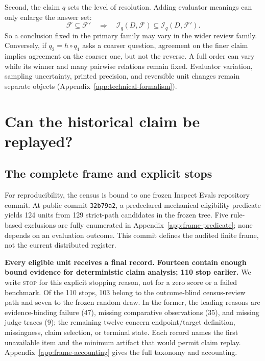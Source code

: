 \documentclass{article}
\newcommand{\STOP}{\textsc{stop}}
\newcommand{\F}{\mathcal F}
\newcommand{\I}{\mathcal I}
\begin{document}
Second, the claim \(q\) sets the level of resolution.  Adding evaluator meanings can only enlarge the answer set:
\begin{equation}
  \F\subseteq\F'
  \quad\Longrightarrow\quad
  \I_q(D,\F)\subseteq\I_q(D,\F').
  \label{eq:domain-monotonicity}
\end{equation}
So a conclusion fixed in the primary family may vary in the wider review family.  Conversely, if \(q_2=h\circ q_1\) asks a coarser question, agreement on the finer claim implies agreement on the coarser one, but not the reverse.  A full order can vary while its winner and many pairwise relations remain fixed.  Evaluator variation, sampling uncertainty, printed precision, and reversible unit changes remain separate objects (Appendix~\ref{app:technical-formalism}).

\section{Can the historical claim be replayed?}

\subsection{The complete frame and explicit stops}

For reproducibility, the census is bound to one frozen Inspect Evals repository commit.  At public commit \texttt{32b79a2}, a predeclared mechanical eligibility predicate yields 124 units from 129 strict-path candidates in the frozen tree.  Five rule-based exclusions are fully enumerated in Appendix~\ref{app:frame-predicate}; none depends on an evaluation outcome.  This commit defines the audited finite frame, not the current distributed register.

\textbf{Every eligible unit receives a final record.  Fourteen contain enough bound evidence for deterministic claim analysis; 110 stop earlier.}  We write \STOP{} for this explicit stopping reason, not for a zero score or a failed benchmark.  Of the 110 stops, 103 belong to the outcome-blind census-review path and seven to the frozen random draw.  In the former, the leading reasons are evidence-binding failure (47), missing comparative observations (35), and missing judge traces (9); the remaining twelve concern endpoint/target definition, missingness, claim selection, or terminal state.  Each record names the first unavailable item and the minimum artifact that would permit claim replay.  Appendix~\ref{app:frame-accounting} gives the full taxonomy and accounting.
\end{document}
